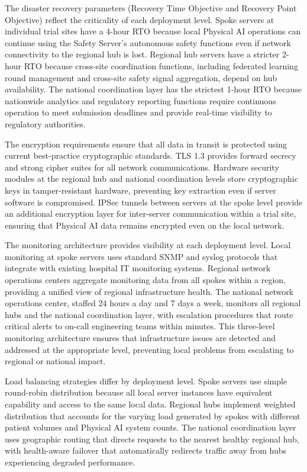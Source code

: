 The disaster recovery parameters (Recovery Time Objective and Recovery Point
Objective) reflect the criticality of each deployment level. Spoke servers at
individual trial sites have a 4-hour RTO because local Physical AI operations
can continue using the Safety Server's autonomous safety functions even if
network connectivity to the regional hub is lost. Regional hub servers have a
stricter 2-hour RTO because cross-site coordination functions, including
federated learning round management and cross-site safety signal aggregation,
depend on hub availability. The national coordination layer has the strictest
1-hour RTO because nationwide analytics and regulatory reporting functions
require continuous operation to meet submission deadlines and provide real-time
visibility to regulatory authorities.

The encryption requirements ensure that all data in transit is protected using
current best-practice cryptographic standards. TLS 1.3 provides forward secrecy
and strong cipher suites for all network communications. Hardware security
modules at the regional hub and national coordination levels store cryptographic
keys in tamper-resistant hardware, preventing key extraction even if server
software is compromised. IPSec tunnels between servers at the spoke level
provide an additional encryption layer for inter-server communication within a
trial site, ensuring that Physical AI data remains encrypted even on the local
network.

The monitoring architecture provides visibility at each deployment level. Local
monitoring at spoke servers uses standard SNMP and syslog protocols that
integrate with existing hospital IT monitoring systems. Regional network
operations centers aggregate monitoring data from all spokes within a region,
providing a unified view of regional infrastructure health. The national
network operations center, staffed 24 hours a day and 7 days a week, monitors
all regional hubs and the national coordination layer, with escalation
procedures that route critical alerts to on-call engineering teams within
minutes. This three-level monitoring architecture ensures that infrastructure
issues are detected and addressed at the appropriate level, preventing local
problems from escalating to regional or national impact.

Load balancing strategies differ by deployment level. Spoke servers use simple
round-robin distribution because all local server instances have equivalent
capability and access to the same local data. Regional hubs implement weighted
distribution that accounts for the varying load generated by spokes with
different patient volumes and Physical AI system counts. The national
coordination layer uses geographic routing that directs requests to the nearest
healthy regional hub, with health-aware failover that automatically redirects
traffic away from hubs experiencing degraded performance.

